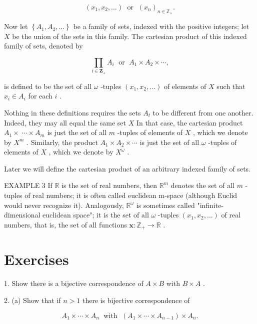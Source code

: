\documentclass[10pt]{article}
\begin{document}
\[
\left( {{x}_{1},{x}_{2},\ldots }\right) \;\text{ or }\;{\left( {x}_{n}\right) }_{n \in  {\mathbb{Z}}_{ + }}.
\]

Now let \(\left\{  {{A}_{1},{A}_{2},\ldots }\right\}\) be a family of sets, indexed with the positive integers; let \(X\) be the union of the sets in this family. The cartesian product of this indexed family of sets, denoted by

\[
\mathop{\prod }\limits_{{i \in  {\mathbf{Z}}_{ + }}}{A}_{i}\;\text{ or }\;{A}_{1} \times  {A}_{2} \times  \cdots ,
\]

is defined to be the set of all \(\omega\) -tuples \(\left( {{x}_{1},{x}_{2},\ldots }\right)\) of elements of \(X\) such that \({x}_{i} \in  {A}_{i}\) for each \(i\) .

Nothing in these definitions requires the sets \({A}_{t}\) to be different from one another. Indeed, they may all equal the same set \(X\) In that case, the cartesian product \({A}_{1} \times \; \cdots  \times  {A}_{m}\) is just the set of all \(m\) -tuples of elements of \(X\) , which we denote by \({X}^{m}\) . Similarly, the product \({A}_{1} \times  {A}_{2} \times  \cdots\) is just the set of all \(\omega\) -tuples of elements of \(X\) , which we denote by \({X}^{\omega }\) .

Later we will define the cartesian product of an arbitrary indexed family of sets.

EXAMPLE 3 If \(\mathbb{R}\) is the set of real numbers, then \({\mathbb{R}}^{m}\) denotes the set of all \(m\) -tuples of real numbers; it is often called euclidean m-space (although Euclid would never recognize it). Analogously, \({\mathbb{R}}^{\omega }\) is sometimes called "infinite-dimensional euclidean space"; it is the set of all \(\omega\) -tuples \(\left( {{x}_{1},{x}_{2},\ldots }\right)\) of real numbers, that is, the set of all functions \(\mathbf{x} : {\mathbb{Z}}_{ + } \rightarrow  \mathbb{R}\) .

\section*{Exercises}

1. Show there is a bijective correspondence of \(A \times  B\) with \(B \times  A\) .

2. (a) Show that if \(n > 1\) there is bijective correspondence of

\[
{A}_{1} \times  \cdots  \times  {A}_{n}\;\text{ with }\;\left( {{A}_{1} \times  \cdots  \times  {A}_{n - 1}}\right)  \times  {A}_{n}.
\]
\end{document}
